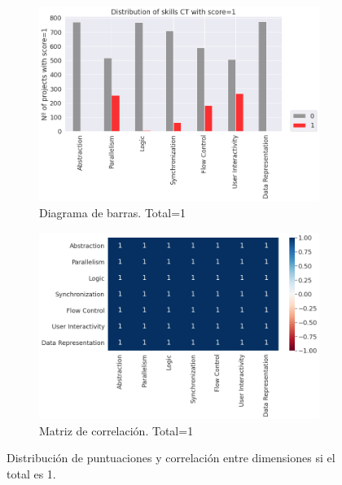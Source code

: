 \documentclass[a4paper, 12pt]{book}
\begin{document}
\begin{figure}
    \centering
    \begin{subfigure}[h]{.49\textwidth} 
        \includegraphics[width=\textwidth]{img/distribucion_1_Scratch}
        \caption{Diagrama de barras. Total=1}
        \label{fig:total1}
    \end{subfigure}       
    \begin{subfigure}[h]{.49\textwidth} 
        \includegraphics[width=\textwidth]{img/corr_1_Scratch}
        \caption{Matriz de correlación. Total=1}
        \label{fig:corr1}
    \end{subfigure}
     \caption{Distribución de puntuaciones y correlación entre dimensiones si el total es 1.}
\end{figure}
\end{document}
